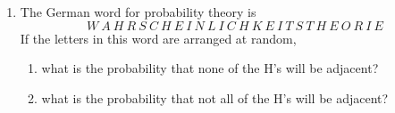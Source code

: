 \documentclass[12pt]{article}
\begin{document}
\begin{enumerate}

\item \label{NTB_22_Wahrscheinlichkeitstheorie} The German word for probability theory is
$$
W\ A\ H\ R\ S\ C\ H\ E\ I\ N\ L\ I\ C\ H\ K\ E\ I\ T\ S\ T\ H\ E\ O\ R\ I\ E
$$
If the letters in this word are arranged at random, 

\begin{enumerate}
\item what is the probability that none of the H's will be adjacent?

\item what is the probability that not all of the H's will be adjacent?
\end{enumerate}




\end{enumerate}
\end{document}
